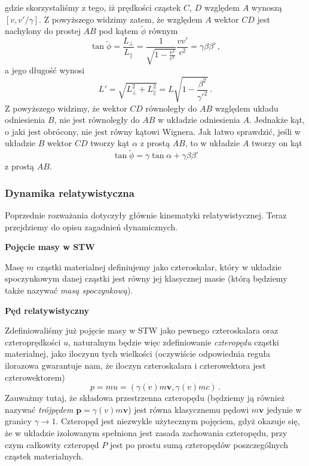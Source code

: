 \documentclass[../main.tex]{subfiles}
\begin{document}
gdzie skorzystaliśmy z tego, iż prędkości cząstek \(C\), \(D\) względem \(A\) wynoszą \([v,v'/\gamma]\). Z powyższego widzimy zatem, że względem \(A\) wektor \(CD\) jest nachylony do prostej \(AB\) pod kątem \(\tilde{\phi}\) równym
\begin{equation*}
    \tan\tilde{\phi}=\frac{L_\perp}{L_\parallel}=\frac{1}{\sqrt{1-\frac{v^2}{c^2}}}\frac{vv'}{c^2}=\gamma\beta\beta'\,,
\end{equation*}
a jego długość wynosi
\begin{equation*}
    L'=\sqrt{L_\perp^2+L_\parallel^2}=L\sqrt{1-\frac{\beta^2}{\gamma'^2}}\,.
\end{equation*}
Z powyższego widzimy, że wektor \(CD\) równoległy do \(AB\) względem układu odniesienia \(B\), nie jest równoległy do \(AB\) w układzie odniesienia \(A\). Jednakże kąt, o jaki jest obrócony, nie jest równy kątowi Wignera. Jak łatwo sprawdzić, jeśli w układzie \(B\) wektor \(CD\) tworzy kąt \(\alpha\) z prostą \(AB\), to w układzie \(A\) tworzy on kąt
\begin{equation*}
    \tan\tilde{\phi}=\gamma\tan\alpha+\gamma\beta\beta'
\end{equation*}
z prostą \(AB\).
\subsubsection{Dynamika relatywistyczna}
Poprzednie rozważania dotyczyły głównie kinematyki relatywistycznej. Teraz przejdziemy do opisu zagadnień dynamicznych.
\medskip

\noindent\textbf{Pojęcie masy w STW}
\medskip

Masę \(m\) cząstki materialnej definiujemy jako czteroskalar, który w układzie spoczynkowym danej cząstki jest równy jej klasycznej masie (którą będziemy także nazywać \textit{masą spoczynkową}).
\medskip

\noindent\textbf{Pęd relatywistyczny}
\medskip

Zdefiniowaliśmy już pojęcie masy w STW jako pewnego czteroskalara oraz czteroprędkości \(u\), naturalnym będzie więc zdefiniowanie \textit{czteropędu} cząstki materialnej, jako iloczynu tych wielkości (oczywiście odpowiednia reguła ilorazowa gwarantuje nam, że iloczyn czteroskalara i czterowektora jest czterowektorem)
\begin{equation*}
    p=mu=\left(\gamma(v)m\mathbf{v},\gamma(v)mc\right)\,.
\end{equation*}
Zauważmy tutaj, że składowa przestrzenna czteropędu (będziemy ją również nazywać \textit{trójpędem} \(\mathbf{p}=\gamma(v)m\mathbf{v}\)) jest równa klasycznemu pędowi \(m\mathbf{v}\) jedynie w granicy \(\gamma\to 1\). Czteropęd jest niezwykle użytecznym pojęciem, gdyż okazuje się, że w układzie izolowanym spełniona jest zasada zachowania czteropędu, przy czym całkowity czteropęd \(P\) jest po prostu sumą czteropędów poszczególnych cząstek materialnych.\\
\end{document}
